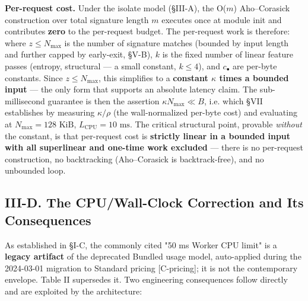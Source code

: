 \textbf{Per-request cost.} Under the isolate model (§III-A), the
O(\(m\)) Aho--Corasick construction over total signature length \(m\)
executes once at module init and contributes \textbf{zero} to the
per-request budget. The per-request work is therefore:
where \(z \le N_{\max}\) is the number of signature matches (bounded by
input length and further capped by early-exit, §V-B), \(k\) is the fixed
number of linear feature passes (entropy, structural --- a small
constant, \(k \le 4\)), and \(c_{\bullet}\) are per-byte constants.
Since \(z \le N_{\max}\), this simplifies to
 a \textbf{constant \(\kappa\) times a bounded
input} --- the only form that supports an absolute latency claim. The
sub-millisecond guarantee is then the assertion
\(\kappa N_{\max} \ll B\), i.e.
which §VII establishes by measuring \(\kappa/\rho\) (the wall-normalized
per-byte cost) and evaluating at \(N_{\max} = 128\text{ KiB}\),
\(L_{\text{CPU}} = 10\text{ ms}\). The critical structural point,
provable \emph{without} the constant, is that per-request cost is
\textbf{strictly linear in a bounded input with all superlinear and
one-time work excluded} --- there is no per-request construction, no
backtracking (Aho--Corasick is backtrack-free), and no unbounded loop.

\subsection{III-D. The CPU/Wall-Clock Correction and Its
Consequences}\label{iii-d-the-cpuwall-clock-correction-and-its-consequences}

As established in §I-C, the commonly cited "50 ms Worker CPU limit" is a
\textbf{legacy artifact} of the deprecated Bundled usage model,
auto-applied during the 2024-03-01 migration to Standard pricing
{[}C-pricing{]}; it is not the contemporary envelope. Table II
supersedes it. Two engineering consequences follow directly and are
exploited by the architecture:

